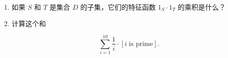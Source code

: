\begin{enumerate}
    \wbvfill
    
    
    \item 如果 $S$ 和 $T$ 是集合 $D$ 的子集，它们的特征函数 $1_S \cdot 1_T$ 的乘积是什么？
    
    \wbvfill
    
    
    \item 计算这个和
    
    \[ \sum_{i=1}^{10} \frac{1}{i} \cdot [ i \; \mbox{is prime} ].
    \]
    
    \wbvfill
    
    \workbookpagebreak
    \end{enumerate}
    
